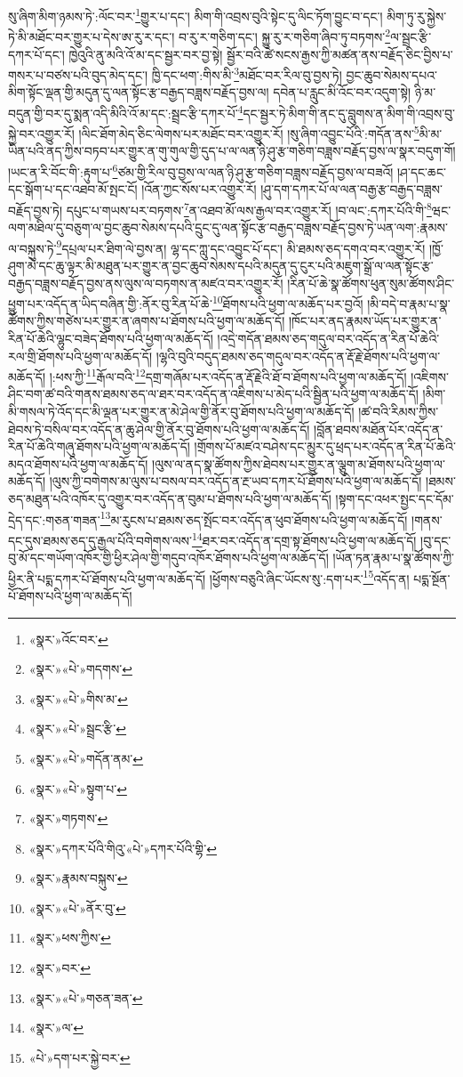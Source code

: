 སུ་ཞིག་མིག་ཉམས་ཏེ་:ལོང་བར་\footnote{«སྣར་»འོང་བར་}གྱུར་པ་དང་། མིག་གི་འབྲས་བུའི་སྟེང་དུ་ལིང་ཏོག་བྱུང་བ་དང་། མིག་ཏུ་རུ་སྐྱེས་ཏེ་མི་མཐོང་བར་གྱུར་པ་དེས་ཨ་རུ་ར་དང་། བ་རུ་ར་གཅིག་དང་། སྐྱུ་རུ་ར་གཅིག་ཞིབ་ཏུ་བཏགས་\footnote{«སྣར་»«པེ་»གདགས་}ལ་སྦྲང་རྩི་དཀར་པོ་དང་། ཁྱེའུའི་ནུ་མའི་འོ་མ་དང་སྦྱར་བར་བྱ་སྟེ། སྦྱོར་བའི་ཚེ་སངས་རྒྱས་ཀྱི་མཚན་ནས་བརྗོད་ཅིང་བྱིས་པ་གསར་པ་བཙས་པའི་བུད་མེད་དང་། ཁྱི་དང་ཕག་:གིས་མི་\footnote{«སྣར་»«པེ་»གིས་མ་}མཐོང་བར་རིལ་བུ་བྱས་ཏེ། བྱང་ཆུབ་སེམས་དཔའ་མིག་སྟོང་ལྡན་གྱི་མདུན་དུ་ལན་སྟོང་རྩ་བརྒྱད་བཟླས་བརྗོད་བྱས་ལ། དབེན་པ་རླུང་མི་འོང་བར་འདུག་སྟེ། ཉི་མ་བདུན་གྱི་བར་དུ་སྨན་འདི་མིའི་འོ་མ་དང་:སྦྲང་རྩི་དཀར་པོ་\footnote{«སྣར་»«པེ་»སྦྲང་རྩི་}དང་སྦྱར་ཏེ་མིག་གི་ནང་དུ་བླུགས་ན་མིག་གི་འབྲས་བུ་སྐྱེ་བར་འགྱུར་རོ། །ལིང་ཐོག་མེད་ཅིང་ལེགས་པར་མཐོང་བར་འགྱུར་རོ། །སུ་ཞིག་འབྱུང་པོའི་:གདོན་ནས་\footnote{«སྣར་»«པེ་»གདོན་ནམ་}མི་མ་ཡིན་པའི་ནད་ཀྱིས་བཏབ་པར་གྱུར་ན་གུ་གུལ་གྱི་དུད་པ་ལ་ལན་ཉི་ཤུ་རྩ་གཅིག་བཟླས་བརྗོད་བྱས་ལ་སྣར་བདུག་གོ། །ཡང་ན་རི་བོང་གི་:རྟུག་པ་\footnote{«སྣར་»«པེ་»སྟུག་པ་}ཙམ་གྱི་རིལ་བུ་བྱས་ལ་ལན་ཉི་ཤུ་རྩ་གཅིག་བཟླས་བརྗོད་བྱས་ལ་བཟའོ། །ཤ་དང་ཆང་དང་སྒོག་པ་དང་འཐབ་མོ་སྤང་ངོ། །འོན་ཀྱང་སོས་པར་འགྱུར་རོ། །ཤུ་དག་དཀར་པོ་ལ་ལན་བརྒྱ་རྩ་བརྒྱད་བཟླས་བརྗོད་བྱས་ཏེ། དཔུང་པ་གཡས་པར་བཏགས་\footnote{«སྣར་»གཏགས་}ན་འཐབ་མོ་ལས་རྒྱལ་བར་འགྱུར་རོ། །བ་ལང་:དཀར་པོའི་གི་\footnote{«སྣར་»དཀར་པོའི་གིའུ་«པེ་»དཀར་པོའི་གྷི་}ཝང་ལག་མཐིལ་དུ་བཅུག་ལ་བྱང་ཆུབ་སེམས་དཔའི་དྲུང་དུ་ལན་སྟོང་རྩ་བརྒྱད་བཟླས་བརྗོད་བྱས་ཏེ་ཡན་ལག་:རྣམས་ལ་བསྐུས་ཏེ་\footnote{«སྣར་»རྣམས་བསྐུས་}དཔྲལ་པར་ཐིག་ལེ་བྱས་ན། ལྷ་དང་ཀླུ་དང་འབྱུང་པོ་དང་། མི་ཐམས་ཅད་དགའ་བར་འགྱུར་རོ། །ཁྱོ་ཤུག་མེ་དང་ཆུ་ལྟར་མི་མཐུན་པར་གྱུར་ན་བྱང་ཆུབ་སེམས་དཔའི་མདུན་དུ་ངུར་པའི་མཇུག་སྒྲོ་ལ་ལན་སྟོང་རྩ་བརྒྱད་བཟླས་བརྗོད་བྱས་ནས་ལུས་ལ་བཏགས་ན་མཛའ་བར་འགྱུར་རོ། །རིན་པོ་ཆེ་སྣ་ཚོགས་ཕུན་སུམ་ཚོགས་ཤིང་ཕྱུག་པར་འདོད་ན་ཡིད་བཞིན་གྱི་:ནོར་བུ་རིན་པོ་ཆེ་\footnote{«སྣར་»«པེ་»ནོར་བུ་}ཐོགས་པའི་ཕྱག་ལ་མཆོད་པར་བྱའོ། །མི་བདེ་བ་རྣམ་པ་སྣ་ཚོགས་ཀྱིས་གཙེས་པར་གྱུར་ན་ཞགས་པ་ཐོགས་པའི་ཕྱག་ལ་མཆོད་དོ། །ཁོང་པར་ནད་རྣམས་ཡོད་པར་གྱུར་ན་རིན་པོ་ཆེའི་ལྷུང་བཟེད་ཐོགས་པའི་ཕྱག་ལ་མཆོད་དོ། །འདྲེ་གདོན་ཐམས་ཅད་གདུལ་བར་འདོད་ན་རིན་པོ་ཆེའི་རལ་གྲི་ཐོགས་པའི་ཕྱག་ལ་མཆོད་དོ། །ལྷའི་བུའི་བདུད་ཐམས་ཅད་གདུལ་བར་འདོད་ན་རྡོ་རྗེ་ཐོགས་པའི་ཕྱག་ལ་མཆོད་དོ། །:ཕས་ཀྱི་\footnote{«སྣར་»ཕས་ཀྱིས་}རྒོལ་བའི་\footnote{«སྣར་»བར་}དགྲ་གཞོམ་པར་འདོད་ན་རྡོ་རྗེའི་ཐོ་བ་ཐོགས་པའི་ཕྱག་ལ་མཆོད་དོ། །འཇིགས་ཤིང་བག་ཚ་བའི་གནས་ཐམས་ཅད་ལ་ཐར་བར་འདོད་ན་འཇིགས་པ་མེད་པའི་སྦྱིན་པའི་ཕྱག་ལ་མཆོད་དོ། །མིག་མི་གསལ་ཏེ་འོད་དང་མི་ལྡན་པར་གྱུར་ན་མེ་ཤེལ་གྱི་ནོར་བུ་ཐོགས་པའི་ཕྱག་ལ་མཆོད་དོ། །ཚ་བའི་རིམས་ཀྱིས་ཐེབས་ཏེ་བསིལ་བར་འདོད་ན་ཆུ་ཤེལ་གྱི་ནོར་བུ་ཐོགས་པའི་ཕྱག་ལ་མཆོད་དོ། །བློན་ཐབས་མཐོན་པོར་འདོད་ན་རིན་པོ་ཆེའི་གཞུ་ཐོགས་པའི་ཕྱག་ལ་མཆོད་དོ། །གྲོགས་པོ་མཛའ་བཤེས་དང་མྱུར་དུ་ཕྲད་པར་འདོད་ན་རིན་པོ་ཆེའི་མདའ་ཐོགས་པའི་ཕྱག་ལ་མཆོད་དོ། །ལུས་ལ་ནད་སྣ་ཚོགས་ཀྱིས་ཐེབས་པར་གྱུར་ན་ལྕུག་མ་ཐོགས་པའི་ཕྱག་ལ་མཆོད་དོ། །ལུས་ཀྱི་བགེགས་མ་ལུས་པ་བསལ་བར་འདོད་ན་རྔ་ཡབ་དཀར་པོ་ཐོགས་པའི་ཕྱག་ལ་མཆོད་དོ། །ཐམས་ཅད་མཐུན་པའི་འཁོར་དུ་འགྱུར་བར་འདོད་ན་བུམ་པ་ཐོགས་པའི་ཕྱག་ལ་མཆོད་དོ། །སྟག་དང་འཕར་སྤྱང་དང་དོམ་དྲེད་དང་:གཅན་གཟན་\footnote{«སྣར་»«པེ་»གཅན་ཟན་}མ་རུངས་པ་ཐམས་ཅད་སྤོང་བར་འདོད་ན་ཕུབ་ཐོགས་པའི་ཕྱག་ལ་མཆོད་དོ། །གནས་དང་དུས་ཐམས་ཅད་དུ་རྒྱལ་པོའི་བགེགས་ལས་\footnote{«སྣར་»ལ་}ཐར་བར་འདོད་ན་དགྲ་སྟ་ཐོགས་པའི་ཕྱག་ལ་མཆོད་དོ། །བུ་དང་བུ་མོ་དང་གཡོག་འཁོར་གྱི་ཕྱིར་ཤེལ་གྱི་གདུབ་འཁོར་ཐོགས་པའི་ཕྱག་ལ་མཆོད་དོ། །ཡོན་ཏན་རྣམ་པ་སྣ་ཚོགས་ཀྱི་ཕྱིར་ནི་པདྨ་དཀར་པོ་ཐོགས་པའི་ཕྱག་ལ་མཆོད་དོ། །ཕྱོགས་བཅུའི་ཞིང་ཡོངས་སུ་:དག་པར་\footnote{«པེ་»དག་པར་སྐྱེ་བར་}འདོད་ན། པདྨ་སྔོན་པོ་ཐོགས་པའི་ཕྱག་ལ་མཆོད་དོ། 